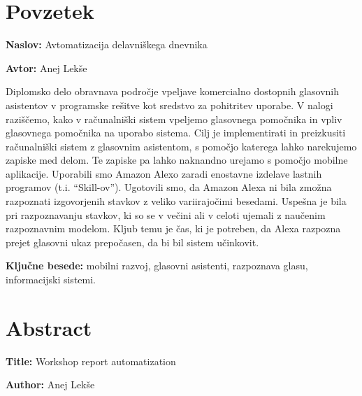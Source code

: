 \documentclass[a4paper, 12pt]{book}
\newcommand{\ttitle}{Avtomatizacija delavniškega dnevnika}
\newcommand{\ttitleEn}{Workshop report automatization}
\newcommand{\tauthor}{Anej Lekše}
\newcommand{\tkeywords}{mobilni razvoj, glasovni asistenti, razpoznava glasu, informacijski sistemi}
\newcommand{\clearemptydoublepage}{\newpage{\pagestyle{empty}\cleardoublepage}}
\begin{document}
\chapter*{Povzetek}

\noindent\textbf{Naslov:} \ttitle
\bigskip

\noindent\textbf{Avtor:} \tauthor
\bigskip


\noindent Diplomsko delo obravnava področje vpeljave komercialno dostopnih glasovnih asistentov v programske rešitve kot sredstvo za pohitritev uporabe.
V nalogi raziščemo, kako v računalniški sistem vpeljemo glasovnega pomočnika in vpliv glasovnega pomočnika na uporabo sistema.
Cilj je implementirati in preizkusiti računalniški sistem z glasovnim asistentom, s pomočjo katerega lahko narekujemo zapiske med delom. 
Te zapiske pa lahko naknandno urejamo s pomočjo mobilne aplikacije.
Uporabili smo Amazon Alexo zaradi enostavne izdelave lastnih programov (t.i. \enquote{Skill-ov}).
Ugotovili smo, da Amazon Alexa ni bila zmožna razpoznati izgovorjenih stavkov z veliko variirajočimi besedami.
Uspešna je bila pri razpoznavanju stavkov, ki so se v večini ali v celoti ujemali z naučenim razpoznavnim modelom.
Kljub temu je čas, ki je potreben, da Alexa razpozna prejet glasovni ukaz prepočasen, da bi bil sistem učinkovit.
\bigskip

\noindent\textbf{Ključne besede:} \tkeywords.
\clearemptydoublepage

\chapter*{Abstract}

\noindent\textbf{Title:} \ttitleEn
\bigskip

\noindent\textbf{Author:} \tauthor
\bigskip
\end{document}
